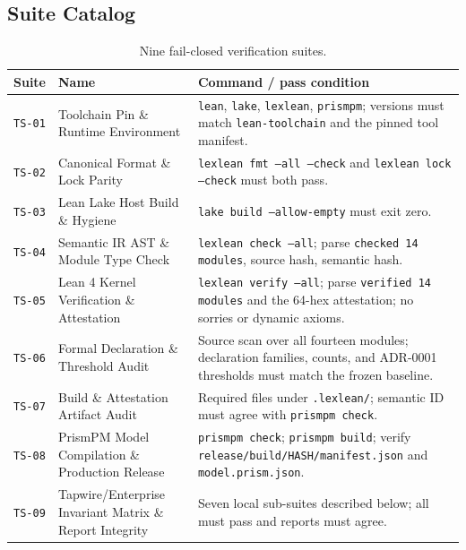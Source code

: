 \documentclass[11pt]{article}
\begin{document}
\subsection{Suite Catalog}

\begin{table}[htbp]
\centering
\small
\begin{tabularx}{\textwidth}{p{1.25cm} p{3.7cm} X}
\toprule
\textbf{Suite} & \textbf{Name} & \textbf{Command / pass condition} \\
\midrule
\texttt{TS-01}
  & Toolchain Pin \& Runtime Environment
  & \texttt{lean}, \texttt{lake}, \texttt{lexlean}, \texttt{prismpm}; versions must match
    \texttt{lean-toolchain} and the pinned tool manifest. \\
\texttt{TS-02}
  & Canonical Format \& Lock Parity
  & \texttt{lexlean fmt --all --check} and \texttt{lexlean lock --check} must both pass. \\
\texttt{TS-03}
  & Lean Lake Host Build \& Hygiene
  & \texttt{lake build --allow-empty} must exit zero. \\
\texttt{TS-04}
  & Semantic IR AST \& Module Type Check
  & \texttt{lexlean check --all}; parse \texttt{checked 14 modules}, source hash, semantic hash. \\
\texttt{TS-05}
  & Lean 4 Kernel Verification \& Attestation
  & \texttt{lexlean verify --all}; parse \texttt{verified 14 modules} and the 64-hex attestation;
    no sorries or dynamic axioms. \\
\texttt{TS-06}
  & Formal Declaration \& Threshold Audit
  & Source scan over all fourteen modules; declaration families, counts, and ADR-0001 thresholds
    must match the frozen baseline. \\
\texttt{TS-07}
  & Build \& Attestation Artifact Audit
  & Required files under \texttt{.lexlean/}; semantic ID must agree with \texttt{prismpm check}. \\
\texttt{TS-08}
  & PrismPM Model Compilation \& Production Release
  & \texttt{prismpm check}; \texttt{prismpm build}; verify
    \texttt{release/build/HASH/manifest.json} and
    \texttt{model.prism.json}. \\
\texttt{TS-09}
  & Tapwire/Enterprise Invariant Matrix \& Report Integrity
  & Seven local sub-suites described below; all must pass and reports must agree. \\
\bottomrule
\end{tabularx}
\caption{Nine fail-closed verification suites.}
\end{table}
\end{document}
